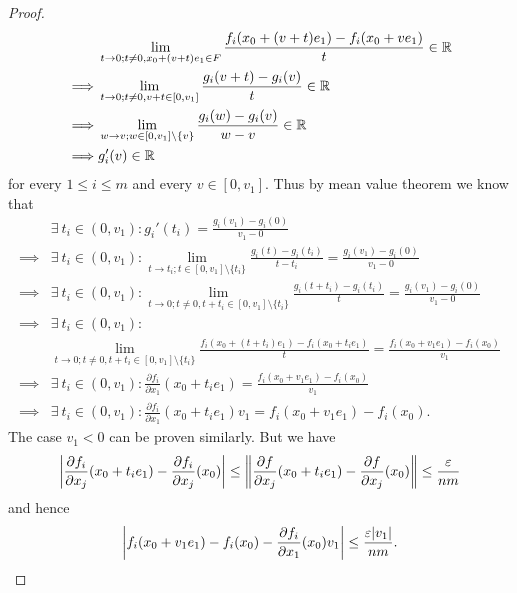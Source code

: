 \begin{proof}
\begin{align*}
             & \lim_{t \to 0 ; t \neq 0, x_0 + (v + t) e_1 \in F} \frac{f_i(x_0 + (v + t) e_1) - f_i(x_0 + v e_1)}{t} \in \R \\
    \implies & \lim_{t \to 0 ; t \neq 0, v + t \in [0, v_1]} \frac{g_i(v + t) - g_i(v)}{t} \in \R                            \\
    \implies & \lim_{w \to v ; w \in [0, v_1] \setminus \{v\}} \frac{g_i(w) - g_i(v)}{w - v} \in \R                          \\
    \implies & g_i'(v) \in \R
  \end{align*}
  for every \(1 \leq i \leq m\) and every \(v \in [0, v_1]\).
  Thus by mean value theorem we know that
  \begin{align*}
             & \exists\ t_i \in (0, v_1) : g_i'(t_i) = \frac{g_i(v_1) - g_i(0)}{v_1 - 0}                                                                                            \\
    \implies & \exists\ t_i \in (0, v_1) : \lim_{t \to t_i; t \in [0, v_1] \setminus \{t_i\}} \frac{g_i(t) - g_i(t_i)}{t - t_i} = \frac{g_i(v_1) - g_i(0)}{v_1 - 0}                 \\
    \implies & \exists\ t_i \in (0, v_1) : \lim_{t \to 0; t \neq 0, t + t_i \in [0, v_1] \setminus \{t_i\}} \frac{g_i(t + t_i) - g_i(t_i)}{t} = \frac{g_i(v_1) - g_i(0)}{v_1 - 0}   \\
    \implies & \exists\ t_i \in (0, v_1) :                                                                                                                                          \\
             & \lim_{t \to 0; t \neq 0, t + t_i \in [0, v_1] \setminus \{t_i\}} \frac{f_i(x_0 + (t + t_i) e_1) - f_i(x_0 + t_i e_1)}{t} = \frac{f_i(x_0 + v_1 e_1) - f_i(x_0)}{v_1} \\
    \implies & \exists\ t_i \in (0, v_1) : \frac{\partial f_i}{\partial x_1}(x_0 + t_i e_1) = \frac{f_i(x_0 + v_1 e_1) - f_i(x_0)}{v_1}                                             \\
    \implies & \exists\ t_i \in (0, v_1) : \frac{\partial f_i}{\partial x_1}(x_0 + t_i e_1) v_1 = f_i(x_0 + v_1 e_1) - f_i(x_0).
  \end{align*}
  The case \(v_1 < 0\) can be proven similarly.
  But we have
  \[
    \abs{\frac{\partial f_i}{\partial x_j}(x_0 + t_i e_1) - \frac{\partial f_i}{\partial x_j}(x_0)} \leq \norm*{\frac{\partial f}{\partial x_j}(x_0 + t_i e_1) - \frac{\partial f}{\partial x_j}(x_0)} \leq \frac{\varepsilon}{nm}
  \]
  and hence
  \[
    \abs{f_i(x_0 + v_1 e_1) - f_i(x_0) - \frac{\partial f_i}{\partial x_1}(x_0) v_1} \leq \frac{\varepsilon \abs{v_1}}{nm}.
\]
\end{proof}
